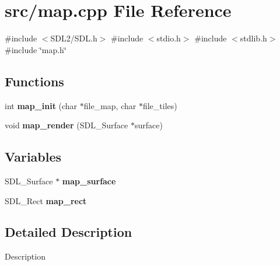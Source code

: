 \section{src/map.cpp \-File \-Reference}
\label{map_8cpp}
{\ttfamily \#include $<$\-S\-D\-L2/\-S\-D\-L.\-h$>$}\*
{\ttfamily \#include $<$stdio.\-h$>$}\*
{\ttfamily \#include $<$stdlib.\-h$>$}\*
{\ttfamily \#include \char`\"{}map.\-h\char`\"{}}\*
\subsection*{\-Functions}
\begin{DoxyCompactItemize}
\item 
int {\bfseries map\-\_\-init} (char $\ast$file\-\_\-map, char $\ast$file\-\_\-tiles)\label{map_8cpp_ac9ee4a88a5607e8de5c4dfbf15b64d75}

\item 
void {\bfseries map\-\_\-render} (\-S\-D\-L\-\_\-\-Surface $\ast$surface)\label{map_8cpp_a2562f990237553ab0276b8bafe0f4714}

\end{DoxyCompactItemize}
\subsection*{\-Variables}
\begin{DoxyCompactItemize}
\item 
\-S\-D\-L\-\_\-\-Surface $\ast$ {\bfseries map\-\_\-surface}\label{map_8cpp_a0bff46b75676e4bd1003a5a3a54ff816}

\item 
\-S\-D\-L\-\_\-\-Rect {\bfseries map\-\_\-rect}\label{map_8cpp_a7369db72cbaebedcceb8091154de453f}

\end{DoxyCompactItemize}


\subsection{\-Detailed \-Description}
\-Description 